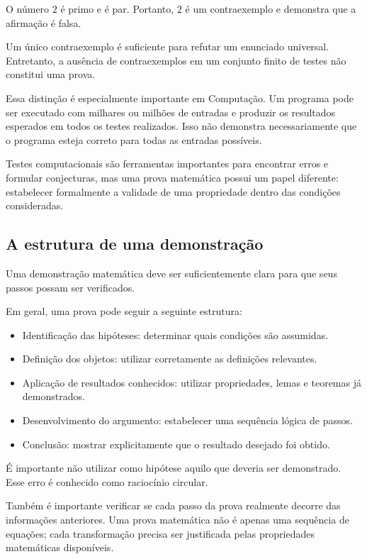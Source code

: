 \documentclass[
  brazilian,
  letterpaper,
]{book}
\providecommand{\tightlist}{%
  \setlength{\itemsep}{0pt}\setlength{\parskip}{0pt}}
\theoremstyle{plain}
\theoremstyle{definition}
\theoremstyle{remark}
\begin{document}
O número \(2\) é primo e é par. Portanto, \(2\) é um contraexemplo e
demonstra que a afirmação é falsa.

Um único contraexemplo é suficiente para refutar um enunciado universal.
Entretanto, a ausência de contraexemplos em um conjunto finito de testes
não constitui uma prova.

Essa distinção é especialmente importante em Computação. Um programa
pode ser executado com milhares ou milhões de entradas e produzir os
resultados esperados em todos os testes realizados. Isso não demonstra
necessariamente que o programa esteja correto para todas as entradas
possíveis.

Testes computacionais são ferramentas importantes para encontrar erros e
formular conjecturas, mas uma prova matemática possui um papel
diferente: estabelecer formalmente a validade de uma propriedade dentro
das condições consideradas.

\subsection{A estrutura de uma
demonstração}\label{a-estrutura-de-uma-demonstrauxe7uxe3o}

Uma demonstração matemática deve ser suficientemente clara para que seus
passos possam ser verificados.

Em geral, uma prova pode seguir a seguinte estrutura:

\begin{itemize}
\tightlist
\item
  Identificação das hipóteses: determinar quais condições são assumidas.
\item
  Definição dos objetos: utilizar corretamente as definições relevantes.
\item
  Aplicação de resultados conhecidos: utilizar propriedades, lemas e
  teoremas já demonstrados.
\item
  Desenvolvimento do argumento: estabelecer uma sequência lógica de
  passos.
\item
  Conclusão: mostrar explicitamente que o resultado desejado foi obtido.
\end{itemize}

É importante não utilizar como hipótese aquilo que deveria ser
demonstrado. Esse erro é conhecido como raciocínio circular.

Também é importante verificar se cada passo da prova realmente decorre
das informações anteriores. Uma prova matemática não é apenas uma
sequência de equações; cada transformação precisa ser justificada pelas
propriedades matemáticas disponíveis.
\end{document}
